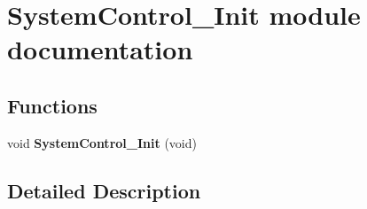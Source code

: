 \hypertarget{group___system_control___init__module}{}\section{System\+Control\+\_\+\+Init module documentation}
\label{group___system_control___init__module}
\subsection*{Functions}
\begin{DoxyCompactItemize}
\item 
void {\bfseries System\+Control\+\_\+\+Init} (void)\hypertarget{group___system_control___init__module_ga62914292909da75f6cb0a3b8552604bb}{}\label{group___system_control___init__module_ga62914292909da75f6cb0a3b8552604bb}

\end{DoxyCompactItemize}


\subsection{Detailed Description}

